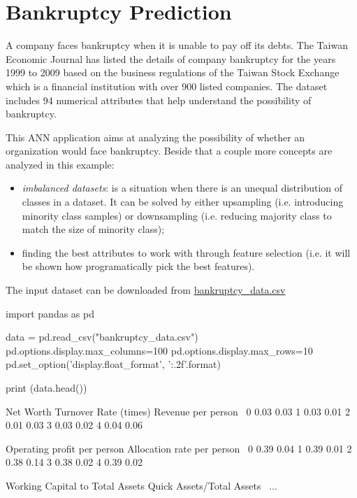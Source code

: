 \section{Bankruptcy Prediction}
A company faces bankruptcy when it is unable to pay off its debts. The Taiwan Economic Journal has listed the details of company bankruptcy for the years 1999 to 2009 based on the business regulations of the Taiwan Stock Exchange which is a financial institution with over 900 listed companies. The dataset includes 94 numerical attributes that help understand the possibility of bankruptcy.

This ANN application aims at analyzing the possibility of whether an organization would face bankruptcy. Beside that a couple more concepts are analyzed in this example:
\begin{itemize}
\item \emph{imbalanced datasets}: is a situation when there is an unequal distribution of classes in a dataset. It can be solved by either upsampling (i.e. introducing minority class samples) or downsampling (i.e. reducing majority class to match the size of minority class);
\item finding the best attributes to work with through feature selection (i.e. it will be shown how programatically pick the best features).
\end{itemize}

The input dataset can be downloaded from \href{https://raw.githubusercontent.com/matteosan1/finance_course/develop/libro/input_files/bankruptcy_data.csv}{bankruptcy\_data.csv}
\begin{ipython}
import pandas as pd
	
data = pd.read_csv("bankruptcy_data.csv")
pd.options.display.max_columns=100
pd.options.display.max_rows=10
pd.set_option('display.float_format', '{:.2f}'.format)
	
print (data.head())
\end{ipython}
\begin{ioutput}
Net Worth Turnover Rate (times)  Revenue per person  \
0                          0.03                0.03   
1                          0.03                0.01   
2                          0.01                0.03   
3                          0.03                0.02   
4                          0.04                0.06   
	
Operating profit per person  Allocation rate per person  \
0                      0.39                        0.04   
1                      0.39                        0.01   
2                      0.38                        0.14   
3                      0.38                        0.02   
4                      0.39                        0.02   

Working Capital to Total Assets  Quick Assets/Total Assets  \
...                        
\end{ioutput}


